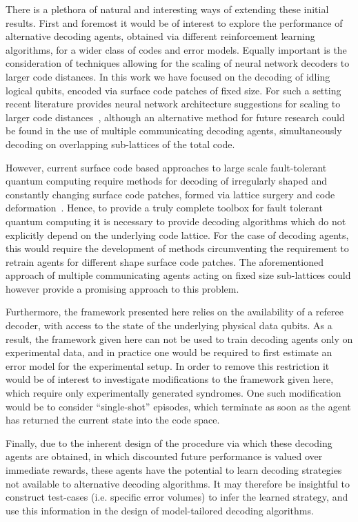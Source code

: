 \documentclass[twocolumn,preprintnumbers,amsmath,amssymb,notitlepage,nofootinbib,longbibliography,superscriptaddress,aps,pra,10pt]{revtex4-1}
\begin{document}
	There is a plethora of natural and interesting ways of extending these initial results.
	First and foremost it would be of interest to explore the performance of alternative decoding agents, obtained via different reinforcement learning algorithms, for a wider class of codes and error models.
	Equally important is the consideration of techniques allowing for the scaling of neural network decoders to larger code distances.
	In this work we have focused on the decoding of idling logical qubits, encoded via surface code patches of fixed size.
	For such a setting recent literature provides neural network architecture suggestions for scaling to larger code distances~\cite{Ni18}, although an alternative method for future research could be found in the use of multiple communicating decoding agents, simultaneously decoding on overlapping sub-lattices of the total code.

	However, current surface code based approaches to large scale fault-tolerant quantum computing require methods for decoding of irregularly shaped and constantly changing surface code patches, formed via lattice surgery and code deformation~\cite{Litinski18b,Fowler18}.
	Hence, to provide a truly complete toolbox for fault tolerant quantum computing it is necessary to provide decoding algorithms which do not explicitly depend on the underlying code lattice.
	For the case of decoding agents, this would require the development of methods circumventing the requirement to retrain agents for different shape surface code patches.
	The aforementioned approach of multiple communicating agents acting on fixed size sub-lattices could however provide a promising approach to this problem.

	Furthermore, the framework presented here relies on the availability of a referee decoder, with access to the state of the underlying physical data qubits.
	As a result, the framework given here can not be used to train decoding agents only on experimental data, and in practice one would be required to first estimate an error model for the experimental setup.
	In order to remove this restriction it would be of interest to investigate modifications to the framework given here, which require only experimentally generated syndromes.
	One such modification would be to consider ``single-shot'' episodes, which terminate as soon as the agent has returned the current state into the code space.

	Finally, due to the inherent design of the procedure via which these decoding agents are obtained, in which discounted future performance is valued over immediate rewards, these agents have the potential to learn decoding strategies not available to alternative decoding algorithms.
	It may therefore be insightful to construct test-cases (i.e. specific error volumes) to infer the learned strategy, and use this information in the design of model-tailored decoding algorithms.
	
\end{document}
